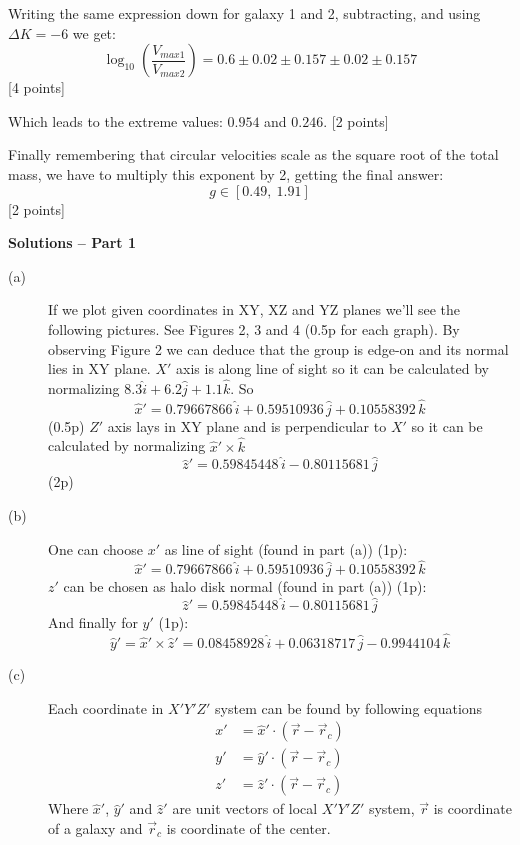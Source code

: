 \begin{description}
  Writing the same expression down for galaxy 1 and 2, subtracting, and
  using $\Delta K = -6$ we get:
  \[ \log_{10}\!\left(\frac{V_{max1}}{V_{max2}}\right)
     = 0.6\pm 0.02\pm 0.157\pm 0.02\pm 0.157 \]
  \hfill[4 points]

  Which leads to the extreme values: $0.954$ and $0.246$.
  \hfill[2 points]

  Finally remembering that circular velocities scale as the square root
  of the total mass, we have to multiply this exponent by 2, getting the
  final answer:
  \[ g\in[0.49,\ 1.91] \]
  \hfill[2 points]
\end{description}

\textbf{Solutions -- Part 1}

\begin{description}
\item[(a)] If we plot given coordinates in XY, XZ and YZ planes we'll see
  the following pictures. See Figures 2, 3 and 4 (0.5p for each graph).
  By observing Figure 2 we can deduce that the group is edge-on and its
  normal lies in XY plane. $X'$ axis is along line of sight so it can be
  calculated by normalizing
  $8.3\hat{i} + 6.2\hat{j} + 1.1\hat{k}$. So
  \[ \hat{x}' = 0.79667866\,\hat{i} + 0.59510936\,\hat{j}
     + 0.10558392\,\hat{k} \]
  (0.5p) $Z'$ axis lays in XY plane and is perpendicular to $X'$ so it
  can be calculated by normalizing $\hat{x}'\times\hat{k}$
  \[ \hat{z}' = 0.59845448\,\hat{i} - 0.80115681\,\hat{j} \]
  \hfill(2p)

\item[(b)] One can choose $x'$ as line of sight (found in part (a)) (1p):
  \[ \hat{x}' = 0.79667866\,\hat{i} + 0.59510936\,\hat{j}
     + 0.10558392\,\hat{k} \]
  $z'$ can be chosen as halo disk normal (found in part (a)) (1p):
  \[ \hat{z}' = 0.59845448\,\hat{i} - 0.80115681\,\hat{j} \]
  And finally for $y'$ (1p):
  \[ \hat{y}' = \hat{x}'\times\hat{z}'
     = 0.08458928\,\hat{i} + 0.06318717\,\hat{j} - 0.9944104\,\hat{k} \]

\item[(c)] Each coordinate in $X'Y'Z'$ system can be found by following
  equations
  \begin{align*}
  x' &= \hat{x}'\cdot(\vec{r} - \vec{r}_c)\\
  y' &= \hat{y}'\cdot(\vec{r} - \vec{r}_c)\\
  z' &= \hat{z}'\cdot(\vec{r} - \vec{r}_c)
  \end{align*}
  Where $\hat{x}'$, $\hat{y}'$ and $\hat{z}'$ are unit vectors of local
  $X'Y'Z'$ system, $\vec{r}$ is coordinate of a galaxy and $\vec{r}_c$
  is coordinate of the center.


\end{description}
